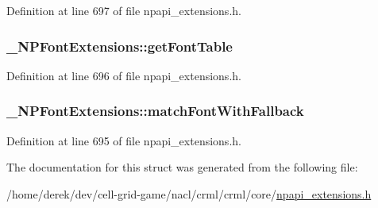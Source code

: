 Definition at line 697 of file npapi\_\-extensions.h.

\hypertarget{struct___n_p_font_extensions_a7e7d1715bdf84093be3e08f98a986b2b}{
\subsubsection[{getFontTable}]{ {\bf \_\-NPFontExtensions::getFontTable}}}
\label{struct___n_p_font_extensions_a7e7d1715bdf84093be3e08f98a986b2b}


Definition at line 696 of file npapi\_\-extensions.h.

\hypertarget{struct___n_p_font_extensions_a76de211ff3a72e2ece70f6c54d81a816}{
\subsubsection[{matchFontWithFallback}]{ {\bf \_\-NPFontExtensions::matchFontWithFallback}}}
\label{struct___n_p_font_extensions_a76de211ff3a72e2ece70f6c54d81a816}


Definition at line 695 of file npapi\_\-extensions.h.



The documentation for this struct was generated from the following file:\begin{DoxyCompactItemize}
\item 
/home/derek/dev/cell-\/grid-\/game/nacl/crml/crml/core/\hyperlink{npapi__extensions_8h}{npapi\_\-extensions.h}\end{DoxyCompactItemize}
